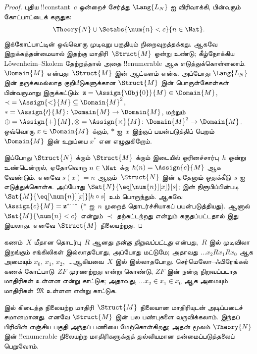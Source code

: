 \documentclass[11pt,a4paper,openany]{memoir}
\begin{document}
\begin{proof}
புதிய !!{constant}~$c$ ஒன்றைச் சேர்த்து $\Lang{L_N}$ ஐ விரிவாக்கி,
பின்வரும் கோட்பாட்டைக் கருதுக:
\[
\Theory{N} \cup \Setabs{\num{n} < c}{n \in \Nat}.
\]
இக்கோட்பாட்டின் ஒவ்வொரு முடிவுறு பகுதியும் நிறைவுறத்தக்கது.
ஆகவே இறுக்கத்தன்மையால் இதற்கு மாதிரி~$\Struct{M}$ ஒன்று உண்டு;
கீழ்நோக்கிய L\"owenheim--Skolem தேற்றத்தால் அதை
!!{enumerable} ஆக எடுத்துக்கொள்ளலாம்.
$\Domain{M}$ என்பது~$\Struct{M}$ இன் ஆட்களம் என்க. அப்போது
$\Lang{L_N}$ இன் தருக்கமல்லாத குறியீடுகளுக்கான
$\Struct{M}$ இன் பொருள்கோள்கள் பின்வருமாறு இருக்கட்டும்:
$\mathbf{z} = \Assign{\Obj{0}}{M} \in \Domain{M}$,
${\prec} =
\Assign{<}{M} \subseteq \Domain{M}^2$,
$* = \Assign{\prime}{M} \colon
\Domain{M} \to \Domain{M}$, மற்றும்
$\oplus = \Assign{+}{M}, \otimes =
\Assign{\times}{M} \colon \Domain{M}^2 \to \Domain{M}$.
ஒவ்வொரு $x \in \Domain{M}$ க்கும், $*$ ஐ~$x$ இற்குப்
பயன்படுத்திப் பெறும் $\Domain{M}$ இன் உறுப்பை $x^*$ என எழுதுகிறோம்.

இப்போது $\Struct{N}$ க்கும் $\Struct{M}$ க்கும் இடையில்
ஓரினச்சார்பு~$h$ ஒன்று உண்டென்றால், ஏதோவொரு
$n \in \Nat$ க்கு $h(n) = \Assign{c}{M}$ ஆக வேண்டும்.
எனவே $s(x) = n$ ஆகும்~$\Struct{N}$ இன் ஏதேனும் ஒதுக்கீடு~$s$
ஐ எடுத்துக்கொள்க. அப்போது
$\Sat{N}{\eq[\num{n}][x]}[s]$;  இன்
நிரூபிப்பின்படி
$\Sat{M}{\eq[\num{n}][x]}[h \circ s]$ உம் பொருந்தும்.
ஆகவே $\Assign{c}{M} =
\mathbf{z}^{*\cdots *}$ ($*$ ஐ~$n$ முறைத் தொடர்ச்சியாகப்
பயன்படுத்தியது). ஆனால்
$\Sat{M}{\num{n} < c}$ என்றும் $\prec$ தற்சுட்டற்றது
என்றும் கருதப்பட்டதால் இது இயலாது. எனவே $\Struct{M}$
நிலையற்றது.
\end{proof}

\begin{prob}
கணம்~$X$ மீதான தொடர்பு~$R$ ஆனது \emph{நன்கு நிறுவப்பட்டது}
என்பது,~$R$ இல் முடிவிலா இறங்கும் சங்கிலிகள் இல்லாதபோது,
அப்போது மட்டுமே; அதாவது
$\dots x_2Rx_1Rx_0$ ஆக அமையும்
$x_0$, $x_1$, $x_2$,~\dots ஆகியவை~$X$ இல் இல்லாதபோது.
செர்மெலோ--ஃபிரேங்கல் கணக் கோட்பாடு~$ZF$ முரணற்றது
என்று கொண்டு, $ZF$ இன் நன்கு நிறுவப்படாத மாதிரிகள்
உள்ளன என்று காட்டுக; அதாவது,
$\dots x_2 \in x_1 \in x_0$ ஆக அமையும்
மாதிரிகள்~$\mathfrak{M}$ உள்ளன என்று காட்டுக.
\end{prob}

 இல் கிடைத்த நிலையற்ற மாதிரி~$\Struct{M}$
நிலையான மாதிரியுடன் அடிப்படைச் சமானமானது. எனவே
$\Struct{M}$ இன் பல பண்புகளை வருவிக்கலாம்.
இந்தப் பிரிவின் எஞ்சிய பகுதி அந்தப் பணியை மேற்கொள்கிறது;
அதன் மூலம் $\Theory{N}$ இன் !!{enumerable} நிலையற்ற
மாதிரிகளுக்குத் துல்லியமான தன்மைப்படுத்தலைப் பெறுவோம்.
\end{document}
